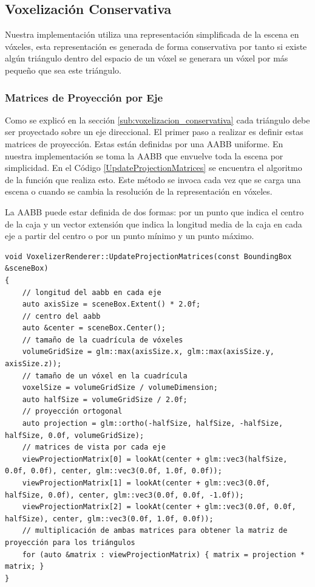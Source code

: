 \subsection{Voxelización Conservativa} %
\label{sub:voxelization_impl}
Nuestra implementación utiliza una representación simplificada de la escena en vóxeles, esta representación es generada de forma conservativa por tanto si existe algún triángulo dentro del espacio de un vóxel se generara un vóxel por más pequeño que sea este triángulo.
 
\subsubsection{Matrices de Proyección por Eje}

Como se explicó en la sección \ref{sub:voxelizacion_conservativa} cada triángulo debe ser proyectado sobre un eje direccional. El primer paso a realizar es definir estas matrices de proyección. Estas están definidas por una \ac{AABB} uniforme. En nuestra implementación se toma la \ac{AABB} que envuelve toda la escena por simplicidad. En el Código \ref{UpdateProjectionMatrices} se encuentra el algoritmo de la función que realiza esto. Este método se invoca cada vez que se carga una escena o cuando se cambia la resolución de la representación en vóxeles.

La \ac{AABB} puede estar definida de dos formas: por un punto que indica el centro de la caja y un vector extensión que indica la longitud media de la caja en cada eje a partir del centro o por un punto mínimo y un punto máximo. 
\\
\begin{lstlisting}[caption={Creación de matrices de proyección ortogonal por cada eje direccional}, label=UpdateProjectionMatrices]
void VoxelizerRenderer::UpdateProjectionMatrices(const BoundingBox &sceneBox)
{
    // longitud del aabb en cada eje
    auto axisSize = sceneBox.Extent() * 2.0f;
    // centro del aabb
    auto &center = sceneBox.Center();
    // tamaño de la cuadrícula de vóxeles
    volumeGridSize = glm::max(axisSize.x, glm::max(axisSize.y, axisSize.z));
    // tamaño de un vóxel en la cuadrícula
    voxelSize = volumeGridSize / volumeDimension;
    auto halfSize = volumeGridSize / 2.0f;
    // proyección ortogonal
    auto projection = glm::ortho(-halfSize, halfSize, -halfSize, halfSize, 0.0f, volumeGridSize);
    // matrices de vista por cada eje
    viewProjectionMatrix[0] = lookAt(center + glm::vec3(halfSize, 0.0f, 0.0f), center, glm::vec3(0.0f, 1.0f, 0.0f));
    viewProjectionMatrix[1] = lookAt(center + glm::vec3(0.0f, halfSize, 0.0f), center, glm::vec3(0.0f, 0.0f, -1.0f));
    viewProjectionMatrix[2] = lookAt(center + glm::vec3(0.0f, 0.0f, halfSize), center, glm::vec3(0.0f, 1.0f, 0.0f));
    // multiplicación de ambas matrices para obtener la matriz de proyección para los triángulos
    for (auto &matrix : viewProjectionMatrix) { matrix = projection * matrix; }
}
\end{lstlisting}

